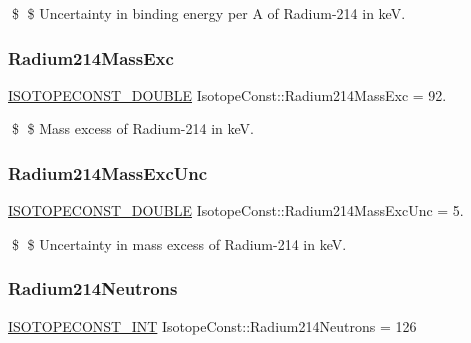 \$ \$ Uncertainty in binding energy per A of Radium-\/214 in keV. \mbox{\label{group___isotope_const-_radium-_ra214_gaf3c7c34b260e3282638b55793440f700}} 
\subsubsection{\texorpdfstring{Radium214\+Mass\+Exc}{Radium214MassExc}}
{\footnotesize\ttfamily \mbox{\hyperlink{group___isotope_const-_macros_ga8f45a7272ce02c0b4c65c44636ed719a}{I\+S\+O\+T\+O\+P\+E\+C\+O\+N\+S\+T\+\_\+\+D\+O\+U\+B\+LE}} Isotope\+Const\+::\+Radium214\+Mass\+Exc = 92.}

\$ \$ Mass excess of Radium-\/214 in keV. \mbox{\label{group___isotope_const-_radium-_ra214_ga28f316b2aef2da2cdf98155a9ea9151e}} 
\subsubsection{\texorpdfstring{Radium214\+Mass\+Exc\+Unc}{Radium214MassExcUnc}}
{\footnotesize\ttfamily \mbox{\hyperlink{group___isotope_const-_macros_ga8f45a7272ce02c0b4c65c44636ed719a}{I\+S\+O\+T\+O\+P\+E\+C\+O\+N\+S\+T\+\_\+\+D\+O\+U\+B\+LE}} Isotope\+Const\+::\+Radium214\+Mass\+Exc\+Unc = 5.}

\$ \$ Uncertainty in mass excess of Radium-\/214 in keV. \mbox{\label{group___isotope_const-_radium-_ra214_ga87a3113df89181e45c920e07718ff9a8}} 
\subsubsection{\texorpdfstring{Radium214\+Neutrons}{Radium214Neutrons}}
{\footnotesize\ttfamily \mbox{\hyperlink{group___isotope_const-_macros_ga5f18360b3e99483a35c32d789e62621c}{I\+S\+O\+T\+O\+P\+E\+C\+O\+N\+S\+T\+\_\+\+I\+NT}} Isotope\+Const\+::\+Radium214\+Neutrons = 126}

